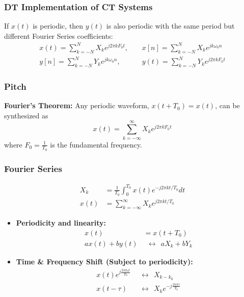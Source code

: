 \documentclass{beamer}
\begin{document}
\begin{frame}
  \frametitle{DT Implementation of CT Systems}

  \begin{center}
  \end{center}
  If $x(t)$ is periodic, then $y(t)$ is also periodic with the same
  period but different Fourier Series coefficients:
  \begin{align*}
    x(t)=\sum_{k=-N}^{N}X_ke^{j2\pi kF_0t},~~~~~
    &x[n]=\sum_{k=-N}^{N}X_ke^{jk\omega_0n}\\
    y[n]=\sum_{k=-N}^{N}Y_ke^{jk\omega_0n},~~~~~
    &y(t)=\sum_{k=-N}^{N}Y_ke^{j2\pi kF_0t}
  \end{align*}  
\end{frame}

\begin{frame}
  \frametitle{Pitch}

  {\bf Fourier's Theorem:} Any periodic waveform,
  $x(t+T_0)=x(t)$, can be synthesized as
  \[
  x(t) = \sum_{k=-\infty}^\infty X_ke^{j2\pi kF_0t}
  \]
  where $F_0=\frac{1}{T_0}$ is the fundamental frequency.
\end{frame}

\begin{frame}
  \frametitle{Fourier Series}
  \begin{align*}
    X_k &= \frac{1}{T_0}\int_0^{T_0} x(t)e^{-j2\pi kt/T_0}dt\\
    x(t) &= \sum_{k=-\infty}^\infty X_k e^{j2\pi kt/T_0}
  \end{align*}
  \begin{itemize}
  \item {\bf Periodicity and linearity:}
    \begin{align*}
      x(t)&=x(t+T_0)\\
      ax(t)+by(t)&~~\leftrightarrow~~aX_k+bY_k
    \end{align*}
  \item {\bf Time \& Frequency Shift (Subject to periodicity):}
    \begin{align*}
      x(t)e^{j\frac{2\pi k_0 t}{T_0}} ~~&\leftrightarrow~~X_{k-k_0}\\
      x(t-\tau) ~~&\leftrightarrow~~X_ke^{-j\frac{2\pi k\tau}{T_0}}
    \end{align*}
  \end{itemize}
\end{frame}  
        
\end{document}
